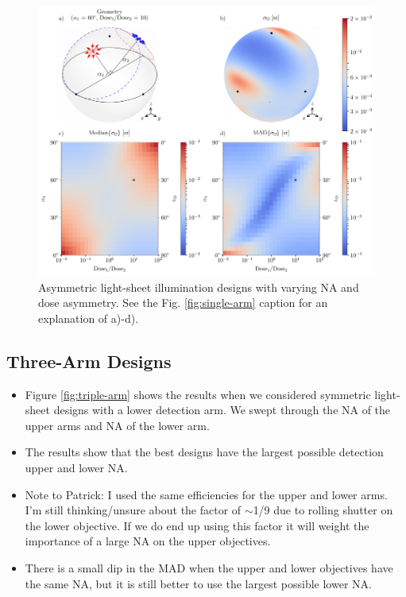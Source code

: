 \documentclass[10pt]{article}
\begin{document}
\begin{figure}[htbp]
\centering\includegraphics[width=\textwidth]{asymmetric-double}
\caption{Asymmetric light-sheet illumination designs with varying NA and
    dose asymmetry. See the Fig. \ref{fig:single-arm} caption for an explanation of a)-d).}
\label{fig:asymmetric-double}
\end{figure}

\subsection{Three-Arm Designs}
\begin{itemize}
\item Figure \ref{fig:triple-arm} shows the results when we considered
  symmetric light-sheet designs with a lower detection arm. We swept
  through the NA of the upper arms and NA of the lower arm.
\item The results show that the best designs have the largest possible detection
  upper and lower NA.
\item Note to Patrick: I used the same efficiencies for the upper and lower
  arms. I'm still thinking/unsure about the factor of $\sim$1/9 due to rolling
  shutter on the lower objective. If we do end up using this factor it will
  weight the importance of a large NA on the upper objectives.
\item There is a small dip in the MAD when the upper and lower objectives have
  the same NA, but it is still better to use the largest possible lower
  NA. 
\end{itemize}
\end{document}
